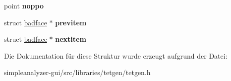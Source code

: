 \begin{DoxyCompactItemize}
\item 
\hypertarget{structtetgenmesh_1_1badface_ada4ec358fcf9261b2f14cff307e66fdf}{point {\bfseries noppo}}\label{structtetgenmesh_1_1badface_ada4ec358fcf9261b2f14cff307e66fdf}

\item 
\hypertarget{structtetgenmesh_1_1badface_a959dcf8e2358a4288d6ff5daa62ac733}{struct \hyperlink{structtetgenmesh_1_1badface}{badface} $\ast$ {\bfseries previtem}}\label{structtetgenmesh_1_1badface_a959dcf8e2358a4288d6ff5daa62ac733}

\item 
\hypertarget{structtetgenmesh_1_1badface_ae6571a458c9d7f96bcda1347d640b948}{struct \hyperlink{structtetgenmesh_1_1badface}{badface} $\ast$ {\bfseries nextitem}}\label{structtetgenmesh_1_1badface_ae6571a458c9d7f96bcda1347d640b948}

\end{DoxyCompactItemize}


Die Dokumentation für diese Struktur wurde erzeugt aufgrund der Datei\-:\begin{DoxyCompactItemize}
\item 
simpleanalyzer-\/gui/src/libraries/tetgen/tetgen.\-h\end{DoxyCompactItemize}
